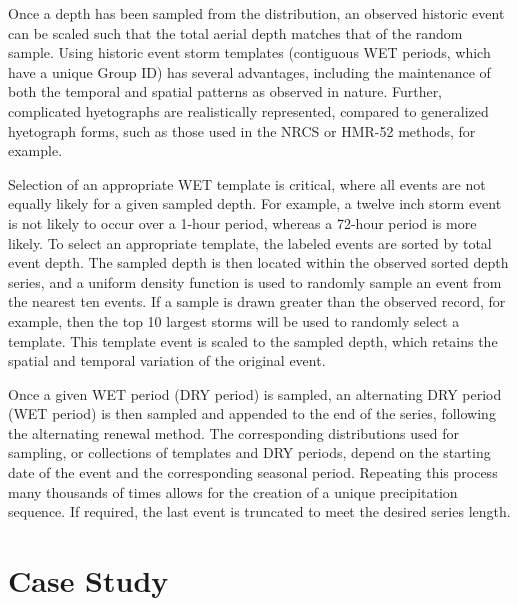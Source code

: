 \documentclass[11pt]{article} %
\begin{document}
Once a depth has been sampled from the distribution, an observed historic event can be scaled such that the total aerial depth matches that of the random sample. Using historic event storm templates (contiguous WET periods, which have a unique Group ID) has several advantages, including the maintenance of both the temporal and spatial patterns as observed in nature. Further, complicated hyetographs are realistically represented, compared to generalized hyetograph forms, such as those used in the NRCS or HMR-52 methods, for example.

Selection of an appropriate WET template is critical, where all events are not equally likely for a given sampled depth. For example, a twelve inch storm event is not likely to occur over a 1-hour period, whereas a 72-hour period is more likely. To select an appropriate template, the labeled events are sorted by total event depth. The sampled depth is then located within the observed sorted depth series, and a uniform density function is used to randomly sample an event from the nearest ten events. If a sample is drawn greater than the observed record, for example, then the top 10 largest storms will be used to randomly select a template. This template event is scaled to the sampled depth, which retains the spatial and temporal variation of the original event.

Once a given WET period (DRY period) is sampled, an alternating DRY period (WET period) is then sampled and appended to the end of the series, following the alternating renewal method. The corresponding distributions used for sampling, or collections of templates and DRY periods, depend on the starting date of the event and the corresponding seasonal period. Repeating this process many thousands of times allows for the creation of a unique precipitation sequence. If required, the last event is truncated to meet the desired series length.

\section{Case Study}
\end{document}
